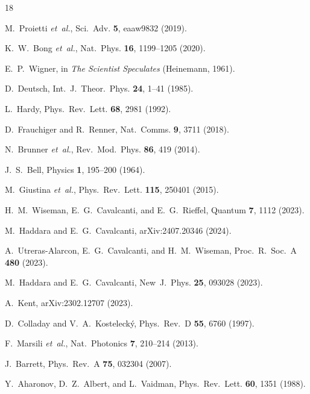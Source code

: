 \documentclass[twocolumn,aps,pra,superscriptaddress,floatfix,10pt]{revtex4-2}
\begin{document}
\begin{thebibliography}{18}

M.~Proietti \emph{et~al.}, Sci.~Adv. \textbf{5}, eaaw9832 (2019).

K.~W.~Bong \emph{et~al.}, Nat.~Phys. \textbf{16}, 1199--1205 (2020).

E.~P.~Wigner, in \emph{The Scientist Speculates} (Heinemann, 1961).

D.~Deutsch, Int.~J.~Theor.~Phys. \textbf{24}, 1--41 (1985).

L.~Hardy, Phys.~Rev.~Lett. \textbf{68}, 2981 (1992).

D.~Frauchiger and R.~Renner, Nat.~Comms. \textbf{9}, 3711 (2018).

N.~Brunner \emph{et~al.}, Rev.~Mod.~Phys. \textbf{86}, 419 (2014).

J.~S.~Bell, Physics \textbf{1}, 195--200 (1964).

M.~Giustina \emph{et~al.}, Phys.~Rev.~Lett. \textbf{115}, 250401 (2015).

H.~M.~Wiseman, E.~G.~Cavalcanti, and E.~G.~Rieffel, Quantum \textbf{7},
1112 (2023).

M.~Haddara and E.~G.~Cavalcanti, arXiv:2407.20346 (2024).

A.~Utreras-Alarcon, E.~G.~Cavalcanti, and H.~M.~Wiseman,
Proc.~R.~Soc.~A \textbf{480} (2023).

M.~Haddara and E.~G.~Cavalcanti, New~J.~Phys. \textbf{25}, 093028 (2023).

A.~Kent, arXiv:2302.12707 (2023).

D.~Colladay and V.~A.~Kosteleck\'{y}, Phys.~Rev.~D \textbf{55}, 6760 (1997).

F.~Marsili \emph{et~al.}, Nat.~Photonics \textbf{7}, 210--214 (2013).

J.~Barrett, Phys.~Rev.~A \textbf{75}, 032304 (2007).

Y.~Aharonov, D.~Z.~Albert, and L.~Vaidman, Phys.~Rev.~Lett. \textbf{60}, 1351 (1988).

\end{thebibliography}
\end{document}
